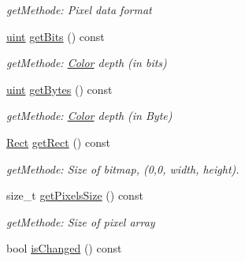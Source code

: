 \begin{DoxyCompactItemize}
\begin{DoxyCompactList}\small\item\em getMethode: Pixel data format \item\end{DoxyCompactList}\item 
\hypertarget{class_f2_c_1_1_bitmap_abb09e143c164a7e137d720c10ec66457}{
\hyperlink{namespace_f2_c_a58be2bac9eb3e3c99cb41b6008bf4fae}{uint} \hyperlink{class_f2_c_1_1_bitmap_abb09e143c164a7e137d720c10ec66457}{getBits} () const }
\label{class_f2_c_1_1_bitmap_abb09e143c164a7e137d720c10ec66457}

\begin{DoxyCompactList}\small\item\em getMethode: \hyperlink{class_f2_c_1_1_color}{Color} depth (in bits) \item\end{DoxyCompactList}\item 
\hypertarget{class_f2_c_1_1_bitmap_a11da241283891c3b8a35c441311d05b0}{
\hyperlink{namespace_f2_c_a58be2bac9eb3e3c99cb41b6008bf4fae}{uint} \hyperlink{class_f2_c_1_1_bitmap_a11da241283891c3b8a35c441311d05b0}{getBytes} () const }
\label{class_f2_c_1_1_bitmap_a11da241283891c3b8a35c441311d05b0}

\begin{DoxyCompactList}\small\item\em getMethode: \hyperlink{class_f2_c_1_1_color}{Color} depth (in Byte) \item\end{DoxyCompactList}\item 
\hypertarget{class_f2_c_1_1_bitmap_aad73aad4b46f5f6f95815a734a8a1282}{
\hyperlink{class_f2_c_1_1_rect}{Rect} \hyperlink{class_f2_c_1_1_bitmap_aad73aad4b46f5f6f95815a734a8a1282}{getRect} () const }
\label{class_f2_c_1_1_bitmap_aad73aad4b46f5f6f95815a734a8a1282}

\begin{DoxyCompactList}\small\item\em getMethode: Size of bitmap, (0,0, width, height). \item\end{DoxyCompactList}\item 
\hypertarget{class_f2_c_1_1_bitmap_a6767ef2d9f9f92a990737b7661161bfb}{
size\_\-t \hyperlink{class_f2_c_1_1_bitmap_a6767ef2d9f9f92a990737b7661161bfb}{getPixelsSize} () const }
\label{class_f2_c_1_1_bitmap_a6767ef2d9f9f92a990737b7661161bfb}

\begin{DoxyCompactList}\small\item\em getMethode: Size of pixel array \item\end{DoxyCompactList}\item 
\hypertarget{class_f2_c_1_1_bitmap_a0753df19a85755b2fafaffb26b577968}{
bool \hyperlink{class_f2_c_1_1_bitmap_a0753df19a85755b2fafaffb26b577968}{isChanged} () const }
\label{class_f2_c_1_1_bitmap_a0753df19a85755b2fafaffb26b577968}


\end{DoxyCompactItemize}
